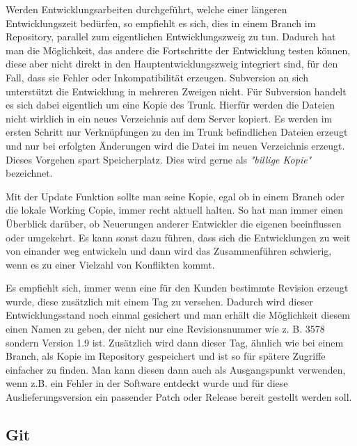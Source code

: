 Werden Entwicklungsarbeiten durchgeführt, welche einer längeren Entwicklungszeit bedürfen, so empfiehlt es sich, dies in einem Branch im Repository, parallel zum eigentlichen Entwicklungszweig zu tun. Dadurch hat man die Möglichkeit, das andere die Fortschritte der Entwicklung testen können, diese aber nicht direkt in den Hauptentwicklungszweig integriert sind, für den Fall, dass sie Fehler oder Inkompatibilität erzeugen.
Subversion an sich unterstützt die Entwicklung in mehreren Zweigen nicht. Für Subversion handelt es sich dabei eigentlich um eine Kopie des Trunk. Hierfür werden die Dateien nicht wirklich in ein neues Verzeichnis auf dem Server kopiert. Es werden im ersten Schritt nur Verknüpfungen zu den im Trunk befindlichen Dateien erzeugt und nur bei erfolgten Änderungen wird die Datei im neuen Verzeichnis erzeugt. Dieses Vorgehen spart Speicherplatz. Dies wird gerne als \textit{"billige Kopie"}\autocite[57]{VkmSVN} bezeichnet.

Mit der Update Funktion sollte man seine Kopie, egal ob in einem Branch oder die lokale Working Copie, immer recht aktuell halten. So hat man immer einen Überblick darüber, ob Neuerungen anderer Entwickler die eigenen beeinflussen oder umgekehrt. Es kann sonst dazu führen, dass sich die Entwicklungen zu weit von einander weg entwickeln und dann wird das Zusammenführen schwierig, wenn es zu einer Vielzahl von Konflikten kommt.

Es empfiehlt sich, immer wenn eine für den Kunden bestimmte Revision erzeugt wurde, diese zusätzlich mit einem Tag zu versehen. Dadurch wird dieser Entwicklungsstand noch einmal gesichert und man erhält die Möglichkeit diesem einen Namen zu geben, der nicht nur eine Revisionsnummer wie z. B. 3578 sondern Version 1.9 ist. Zusätzlich wird dann dieser Tag, ähnlich wie bei einem Branch, als Kopie im Repository gespeichert und ist so für spätere Zugriffe einfacher zu finden. Man kann diesen dann auch als Ausgangspunkt verwenden, wenn z.B. ein Fehler in der Software entdeckt wurde und für diese Auslieferungsversion ein passender Patch oder Release bereit gestellt werden soll.









\subsection{Git}
